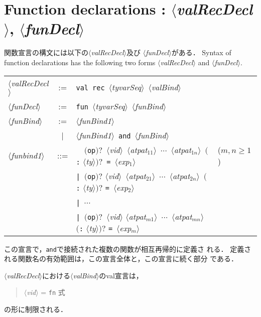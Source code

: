 \documentclass{jbook}
\newcommand{\txt}[2]{#2}
\newcommand{\vbar}{\mbox{\ $|$\ }}
\newcommand{\nonterm}[1]{\mbox{$\langle$}{\it #1}\mbox{$\rangle$}}
\newcommand{\term}[1]{\mbox{{\tt #1}}}
\newcommand{\optional}[1]{\mbox{$($}{\protect #1}\mbox{$)?$}}
\newenvironment{program}{\begin{quote}\begin{tt}}%
                        {\end{tt}\end{quote}}
\begin{document}
\fi%

\section{\txt{関数宣言}{Function declarations} : \nonterm{valRecDecl}, \nonterm{funDecl}}
\ifjp%
	関数宣言の構文には以下の\nonterm{valRecDecl}及び
\nonterm{funDecl}がある．
\else%
	Syntax of function declarations has the following two forms
\nonterm{valRecDecl} and \nonterm{funDecl}.
\fi%

\begin{center}
\begin{tabular}{lcll}
\nonterm{valRecDecl}  &:= & \term{val}\ \term{rec}\ \nonterm{tyvarSeq}\ \nonterm{valBind} \\
\nonterm{funDecl}     &:= & \term{fun}\ \nonterm{tyvarSeq}\ \nonterm{funBind} \\
\nonterm{funBind}     &:=& \nonterm{funBind1} \\
                      &\vbar& \nonterm{funBind1}\ \term{and}\ \nonterm{funBind}\\
\nonterm{funbind1} &::=&
   \term{\ }\ \optional{\term{op}}\ \nonterm{vid}\ \nonterm{atpat$_{11}$}\ $\cdots$\ \nonterm{atpat$_{1n}$}\ \optional{\term{:} \nonterm{ty}}\
   \term{=}\ \nonterm{exp$_1$} & ($m,n\ge 1$)\\
&& \term{|}\ \optional{\term{op}} \nonterm{vid}\
   \nonterm{atpat$_{21}$}\ $\cdots$\ \nonterm{atpat$_{2n}$}\ \optional{\term{:} \nonterm{ty}} 
   \term{=}\ \nonterm{exp$_2$}\\
&&  \term{|}\ $\cdots$\\
&&  \term{|}\ \optional{\term{op}}\ \nonterm{vid} 
   \nonterm{atpat$_{m1}$}\ $\cdots$\ \nonterm{atpat$_{mn}$}\ \optional{\term{:} \nonterm{ty}} 
   \term{=}\ \nonterm{exp$_m$}
\end{tabular}
\end{center}

\ifjp%
	この宣言で，\term{and}で接続された複数の関数が相互再帰的に定義さ
れる．
	定義される関数名の有効範囲は，この宣言全体と，この宣言に続く部分
である．

	\nonterm{valRecDecl}における\nonterm{valBind}のval宣言は，
\begin{program}
\nonterm{vid} = \term{fn} 式
\end{program}
の形に制限される．
\end{document}

